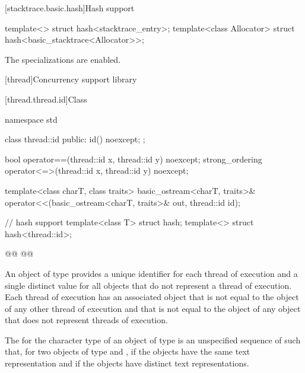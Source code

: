 \documentclass{wg21}
\begin{document}
[stacktrace.basic.hash]{Hash support}

\begin{itemdecl}
    template<> struct hash<stacktrace_entry>;
    template<class Allocator> struct hash<basic_stacktrace<Allocator>>;
\end{itemdecl}

\begin{itemdescr}
    \pnum
    The specializations are enabled.
\end{itemdescr}

[thread]{Concurrency support library}

[thread.thread.id]{Class }

%
%
\begin{codeblock}
    namespace std {
        class thread::id {
            public:
            id() noexcept;
        };

        bool operator==(thread::id x, thread::id y) noexcept;
        strong_ordering operator<=>(thread::id x, thread::id y) noexcept;

        template<class charT, class traits>
        basic_ostream<charT, traits>&
        operator<<(basic_ostream<charT, traits>& out, thread::id id);

        // hash support
        template<class T> struct hash;
        template<> struct hash<thread::id>;

        @@
        @@
    }
\end{codeblock}

\pnum
An object of type  provides a unique identifier for
each thread of execution and a single distinct value for all 
objects that do not represent a thread of
execution. Each thread of execution has an
associated  object that is not equal to the
 object of any other thread of execution and that is not
equal to the  object of any  object that
does not represent threads of execution.

\begin{addedblock}
The  for the character type  of an object of type 
is an unspecified sequence of  such that, for two objects of type   and ,
if  the  objects have the same text
representation and if  the  objects have
distinct text representations.
\end{addedblock}
\end{document}
